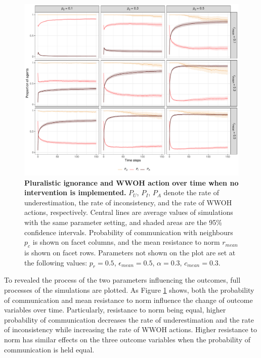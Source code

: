 \documentclass[
  11pt,
]{article}
\begin{document}
\begin{figure}[h]
  \centering
  \includegraphics[width=1\columnwidth]{./figures/factor_for_pi.pdf}
  \caption{\textbf{Pluralistic ignorance and WWOH action over time when no intervention is implemented.} $P_U$, $P_I$, $P_A$ denote the rate of underestimation, the rate of inconsistency, and the rate of WWOH actions, respectively. Central lines are average values of simulations with the same parameter setting, and shaded areas are the 95\% confidence intervals. Probability of communication with neighbours $p_c$ is shown on facet columns, and the mean resistance to norm $r_{mean}$ is shown on facet rows. Parameters not shown on the plot are set at the following values: $p_r = 0.5$, $\epsilon_{mean} = 0.5$, $\alpha = 0.3$, $c_{mean} = 0.3$.}
  \label{fig:2}
\end{figure}

To revealed the process of the two parameters influencing the outcomes,
full processes of the simulations are plotted. As Figure \ref{fig:2}
shows, both the probability of communication and mean resistance to norm
influence the change of outcome variables over time. Particularly,
resistance to norm being equal, higher probability of communication
decreases the rate of underestimation and the rate of inconsistency
while increasing the rate of WWOH actions. Higher resistance to norm has
similar effects on the three outcome variables when the probability of
communication is held equal.

\begingroup
\renewcommand{\arraystretch}{1.5}
\end{document}
